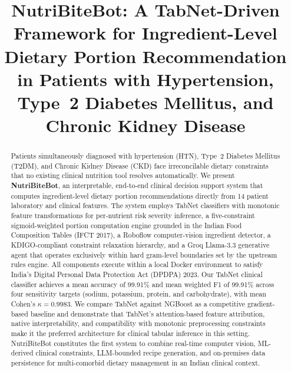 \documentclass[journal]{IEEEtran}
\begin{document}
\title{NutriBiteBot: A TabNet-Driven Framework for Ingredient-Level
Dietary Portion Recommendation in Patients with Hypertension,
Type~2 Diabetes Mellitus, and Chronic Kidney Disease}

\author{
}

\maketitle

\begin{abstract}
Patients simultaneously diagnosed with hypertension (HTN), Type~2 Diabetes
Mellitus (T2DM), and Chronic Kidney Disease (CKD) face irreconcilable
dietary constraints that no existing clinical nutrition tool resolves
automatically. We present \textbf{NutriBiteBot}, an interpretable,
end-to-end clinical decision support system that computes
ingredient-level dietary portion recommendations directly from 14
patient laboratory and clinical features. The system employs TabNet
classifiers with monotonic feature transformations for per-nutrient
risk severity inference, a five-constraint sigmoid-weighted portion
computation engine grounded in the Indian Food Composition Tables (IFCT
2017), a Roboflow computer-vision ingredient detector, a
KDIGO-compliant constraint relaxation hierarchy, and a Groq Llama-3.3
generative agent that operates exclusively within hard gram-level
boundaries set by the upstream rules engine. All components execute
within a local Docker environment to satisfy India's Digital Personal
Data Protection Act (DPDPA) 2023. Our TabNet clinical classifier
achieves a mean accuracy of 99.91\% and mean weighted F1 of 99.91\%
across four sensitivity targets (sodium, potassium, protein, and
carbohydrate), with mean Cohen's $\kappa = 0.9983$. We compare TabNet
against NGBoost as a competitive gradient-based baseline and demonstrate
that TabNet's attention-based feature attribution, native
interpretability, and compatibility with monotonic preprocessing
constraints make it the preferred architecture for clinical tabular
inference in this setting. NutriBiteBot constitutes the first system to
combine real-time computer vision, ML-derived clinical constraints,
LLM-bounded recipe generation, and on-premises data persistence for
multi-comorbid dietary management in an Indian clinical context.
\end{abstract}
\end{document}
